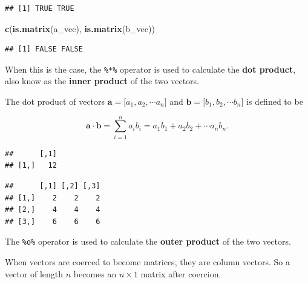 \documentclass[]{book}
\newenvironment{Shaded}{\begin{snugshade}}{\end{snugshade}}
\newcommand{\KeywordTok}[1]{\textcolor[rgb]{0.13,0.29,0.53}{\textbf{#1}}}
\newcommand{\StringTok}[1]{\textcolor[rgb]{0.31,0.60,0.02}{#1}}
\newcommand{\CommentTok}[1]{\textcolor[rgb]{0.56,0.35,0.01}{\textit{#1}}}
\newcommand{\OperatorTok}[1]{\textcolor[rgb]{0.81,0.36,0.00}{\textbf{#1}}}
\newcommand{\NormalTok}[1]{#1}
\theoremstyle{definition}
\theoremstyle{definition}
\theoremstyle{definition}
\theoremstyle{remark}
\begin{document}
\begin{verbatim}
## [1] TRUE TRUE
\end{verbatim}

\begin{Shaded}
\begin{Highlighting}[]
\KeywordTok{c}\NormalTok{(}\KeywordTok{is.matrix}\NormalTok{(a_vec), }\KeywordTok{is.matrix}\NormalTok{(b_vec))}
\end{Highlighting}
\end{Shaded}

\begin{verbatim}
## [1] FALSE FALSE
\end{verbatim}

When this is the case, the \texttt{\%*\%} operator is used to calculate
the \textbf{dot product}, also know as the \textbf{inner product} of the
two vectors.

The dot product of vectors
\(\boldsymbol{a} = \lbrack a_1, a_2, \cdots a_n \rbrack\) and
\(\boldsymbol{b} = \lbrack b_1, b_2, \cdots b_n \rbrack\) is defined to
be

\[
\boldsymbol{a} \cdot \boldsymbol{b} = \sum_{i = 1}^{n} a_i b_i = a_1 b_1 + a_2 b_2 + \cdots a_n b_n.
\]

\begin{Shaded}
\end{Shaded}

\begin{verbatim}
##      [,1]
## [1,]   12
\end{verbatim}

\begin{Shaded}
\end{Shaded}

\begin{verbatim}
##      [,1] [,2] [,3]
## [1,]    2    2    2
## [2,]    4    4    4
## [3,]    6    6    6
\end{verbatim}

The \texttt{\%o\%} operator is used to calculate the \textbf{outer
product} of the two vectors.

When vectors are coerced to become matrices, they are column vectors. So
a vector of length \(n\) becomes an \(n \times 1\) matrix after
coercion.
\end{document}
